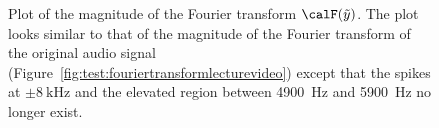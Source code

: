 \documentclass[11pt,a4paper]{book}
\theoremstyle{plain}
\numberwithin{equation}{section}
\newcommand{\ints}{{\mathbb Z}}
\newcommand{\term}{\textbf}
\newcommand{\abs}[1]{\left\vert #1 \right\vert}
\newcounter{test}
\begin{document}
\begin{figure}
\centering
\begin{shaded}
\caption{Plot of the magnitude of the Fourier transform $\calF(\tilde{y})$.  The plot looks similar to that of the magnitude of the Fourier transform of the original audio signal (Figure~\ref{fig:test:fouriertransformlecturevideo}) except that the spikes at $\pm\SI{8}{\kilo\hertz}$ and the elevated region between \SI{4900}{\hertz} and \SI{5900}{\hertz} no longer exist.}\label{fig:test:fftfilteredlecturevideo}
\end{shaded}
\end{figure}




\end{document}
